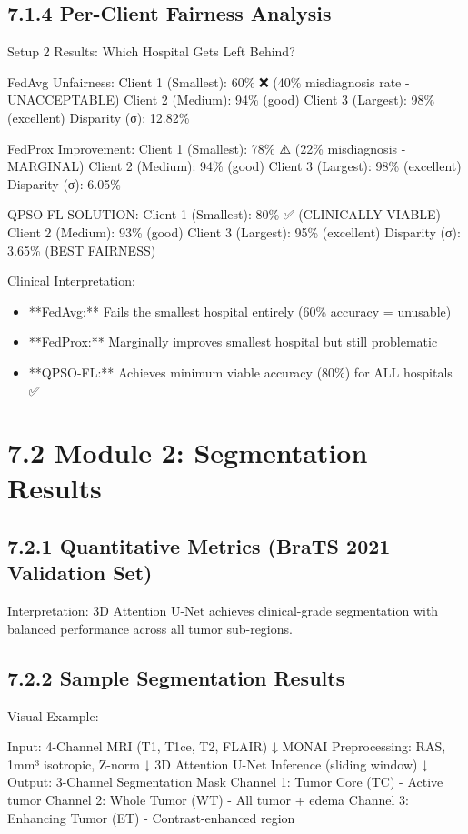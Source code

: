 \subsection{7.1.4 Per-Client Fairness Analysis}
Setup 2 Results: Which Hospital Gets Left Behind?

FedAvg Unfairness:
    Client 1 (Smallest):    60\% ❌ (40\% misdiagnosis rate - UNACCEPTABLE)
    Client 2 (Medium):      94\% (good)
    Client 3 (Largest):     98\% (excellent)
    Disparity (σ):          12.82\%

FedProx Improvement:
    Client 1 (Smallest):    78\% ⚠️ (22\% misdiagnosis - MARGINAL)
    Client 2 (Medium):      94\% (good)
    Client 3 (Largest):     98\% (excellent)
    Disparity (σ):          6.05\%

QPSO-FL SOLUTION:
    Client 1 (Smallest):    80\% ✅ (CLINICALLY VIABLE)
    Client 2 (Medium):      93\% (good)
    Client 3 (Largest):     95\% (excellent)
    Disparity (σ):          3.65\% (BEST FAIRNESS)

Clinical Interpretation:

\begin{itemize}
  \item **FedAvg:** Fails the smallest hospital entirely (60\% accuracy = unusable)
  \item **FedProx:** Marginally improves smallest hospital but still problematic
  \item **QPSO-FL:** Achieves minimum viable accuracy (80\%) for ALL hospitals ✅
\end{itemize}


\section{7.2 Module 2: Segmentation Results}

\subsection{7.2.1 Quantitative Metrics (BraTS 2021 Validation Set)}
Interpretation: 3D Attention U-Net achieves clinical-grade segmentation with balanced performance across all tumor sub-regions.


\subsection{7.2.2 Sample Segmentation Results}
Visual Example:

Input: 4-Channel MRI (T1, T1ce, T2, FLAIR)
  ↓
MONAI Preprocessing: RAS, 1mm³ isotropic, Z-norm
  ↓
3D Attention U-Net Inference (sliding window)
  ↓
Output: 3-Channel Segmentation Mask
  Channel 1: Tumor Core (TC) - Active tumor
  Channel 2: Whole Tumor (WT) - All tumor + edema  
  Channel 3: Enhancing Tumor (ET) - Contrast-enhanced region

